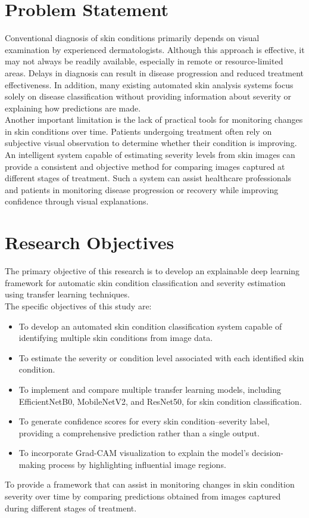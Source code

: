 \section{Problem Statement}
Conventional diagnosis of skin conditions primarily depends on visual examination by experienced dermatologists. Although this approach is effective, it may not always be readily available, especially in remote or resource-limited areas. Delays in diagnosis can result in disease progression and reduced treatment effectiveness. In addition, many existing automated skin analysis systems focus solely on disease classification without providing information about severity or explaining how predictions are made.\\
Another important limitation is the lack of practical tools for monitoring changes in skin conditions over time. Patients undergoing treatment often rely on subjective visual observation to determine whether their condition is improving. An intelligent system capable of estimating severity levels from skin images can provide a consistent and objective method for comparing images captured at different stages of treatment. Such a system can assist healthcare professionals and patients in monitoring disease progression or recovery while improving confidence through visual explanations.

\section{Research Objectives}
The primary objective of this research is to develop an explainable deep learning framework for automatic skin condition classification and severity estimation using transfer learning techniques. \\

The specific objectives of this study are:
\begin{itemize}
    \item To develop an automated skin condition classification system capable of identifying multiple skin conditions from image data.
    \item To estimate the severity or condition level associated with each identified skin condition.
    \item To implement and compare multiple transfer learning models, including EfficientNetB0, MobileNetV2, and ResNet50, for skin condition classification.
    \item To generate confidence scores for every skin condition–severity label, providing a comprehensive prediction rather than a single output.
    \item To incorporate Grad-CAM visualization to explain the model's decision-making process by highlighting influential image regions.
\end{itemize}
To provide a framework that can assist in monitoring changes in skin condition severity over time by comparing predictions obtained from images captured during different stages of treatment.

